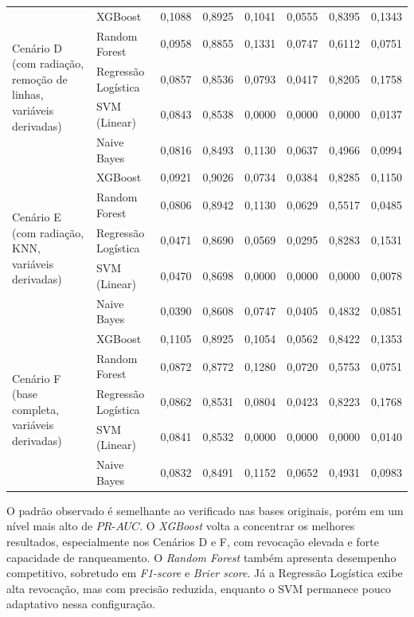 \begin{longtable}{p{3.4cm} l c c c c c c}
\multirow{5}{*}{\parbox{3.4cm}{\centering Cenário D\\(com radiação, remoção de linhas, variáveis derivadas)}} 
   & XGBoost             & 0,1088 & 0,8925 & 0,1041 & 0,0555 & 0,8395 & 0,1343 \\
   & Random Forest       & 0,0958 & 0,8855 & 0,1331 & 0,0747 & 0,6112 & 0,0751 \\
   & Regressão Logística & 0,0857 & 0,8536 & 0,0793 & 0,0417 & 0,8205 & 0,1758 \\
   & SVM (Linear)        & 0,0843 & 0,8538 & 0,0000 & 0,0000 & 0,0000 & 0,0137 \\
   & Naive Bayes         & 0,0816 & 0,8493 & 0,1130 & 0,0637 & 0,4966 & 0,0994 \\
\midrule

\multirow{5}{*}{\parbox{3.4cm}{\centering Cenário E\\(com radiação, KNN, variáveis derivadas)}} 
   & XGBoost             & 0,0921 & 0,9026 & 0,0734 & 0,0384 & 0,8285 & 0,1150 \\
   & Random Forest       & 0,0806 & 0,8942 & 0,1130 & 0,0629 & 0,5517 & 0,0485 \\
   & Regressão Logística & 0,0471 & 0,8690 & 0,0569 & 0,0295 & 0,8283 & 0,1531 \\
   & SVM (Linear)        & 0,0470 & 0,8698 & 0,0000 & 0,0000 & 0,0000 & 0,0078 \\
   & Naive Bayes         & 0,0390 & 0,8608 & 0,0747 & 0,0405 & 0,4832 & 0,0851 \\
\midrule

\multirow{5}{*}{\parbox{3.4cm}{\centering Cenário F\\(base completa, variáveis derivadas)}} 
   & XGBoost             & 0,1105 & 0,8925 & 0,1054 & 0,0562 & 0,8422 & 0,1353 \\
   & Random Forest       & 0,0872 & 0,8772 & 0,1280 & 0,0720 & 0,5753 & 0,0751 \\
   & Regressão Logística & 0,0862 & 0,8531 & 0,0804 & 0,0423 & 0,8223 & 0,1768 \\
   & SVM (Linear)        & 0,0841 & 0,8532 & 0,0000 & 0,0000 & 0,0000 & 0,0140 \\
   & Naive Bayes         & 0,0832 & 0,8491 & 0,1152 & 0,0652 & 0,4931 & 0,0983 \\
\end{longtable}
\endgroup

O padrão observado é semelhante ao verificado nas bases originais, porém em um nível mais alto de $PR\text{-}AUC$. O \textit{XGBoost} volta a concentrar os melhores resultados, especialmente nos Cenários D e F, com revocação elevada e forte capacidade de ranqueamento. O \textit{Random Forest} também apresenta desempenho competitivo, sobretudo em \textit{F1-score} e \textit{Brier score}. Já a Regressão Logística exibe alta revocação, mas com precisão reduzida, enquanto o SVM permanece pouco adaptativo nessa configuração.

